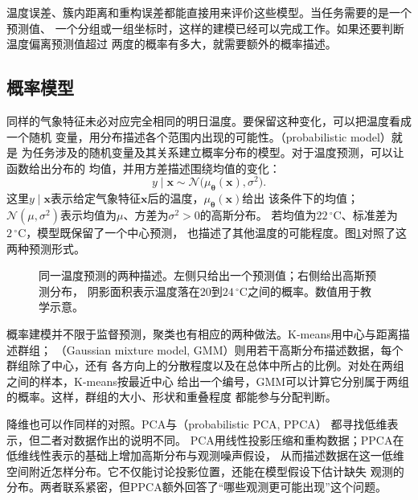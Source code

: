 温度误差、簇内距离和重构误差都能直接用来评价这些模型。当任务需要的是一个预测值、
一个分组或一组坐标时，这样的建模已经可以完成工作。如果还要判断温度偏离预测值超过
两度的概率有多大，就需要额外的概率描述。

\subsection{概率模型}
\label{sec:models-probabilistic}

同样的气象特征未必对应完全相同的明日温度。要保留这种变化，可以把温度看成一个随机
变量，用分布描述各个范围内出现的可能性。（probabilistic model）就是
为任务涉及的随机变量及其关系建立概率分布的模型。对于温度预测，可以让函数给出分布的
均值，并用方差描述围绕均值的变化：
\begin{equation}
  y\mid\bm{x}\sim\mathcal{N}\bigl(\mu_{\bm{\theta}}(\bm{x}),\sigma^2\bigr).
  \label{eq:models-linear-gaussian}
\end{equation}
这里$y\mid\bm{x}$表示给定气象特征$\bm{x}$后的温度，$\mu_{\bm{\theta}}(\bm{x})$给出
该条件下的均值；$\mathcal{N}(\mu,\sigma^2)$表示均值为$\mu$、方差为$\sigma^2>0$的高斯分布。
若均值为$22\,^{\circ}\mathrm{C}$、标准差为$2\,^{\circ}\mathrm{C}$，模型既保留了一个中心预测，
也描述了其他温度的可能程度。图\ref{fig:models-point-distribution}对照了这两种预测形式。

\begin{figure}[htbp]
  \centering
  
  \caption{同一温度预测的两种描述。左侧只给出一个预测值；右侧给出高斯预测分布，
  阴影面积表示温度落在$20$到$24\,^{\circ}\mathrm{C}$之间的概率。数值用于教学示意。}
  \label{fig:models-point-distribution}
\end{figure}

概率建模并不限于监督预测，聚类也有相应的两种做法。K-means用中心与距离描述群组；
（Gaussian mixture model, GMM）则用若干高斯分布描述数据，每个群组除了中心，还有
各方向上的分散程度以及在总体中所占的比例。对处在两组之间的样本，K-means按最近中心
给出一个编号，GMM可以计算它分别属于两组的概率。这样，群组的大小、形状和重叠程度
都能参与分配判断。

降维也可以作同样的对照。PCA与（probabilistic PCA, PPCA）
都寻找低维表示，但二者对数据作出的说明不同。
PCA用线性投影压缩和重构数据；PPCA在低维线性表示的基础上增加高斯分布与观测噪声假设，
从而描述数据在这一低维空间附近怎样分布。它不仅能讨论投影位置，还能在模型假设下估计缺失
观测的分布。两者联系紧密，但PPCA额外回答了“哪些观测更可能出现”这个问题。

